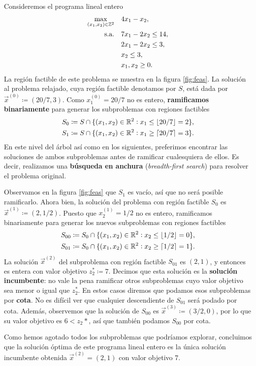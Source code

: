 \begin{example}
	\label{ex:ilp}
	Consideremos el programa lineal entero
	\begin{align*}
		\max_{(x_1, x_2) \in \mathbb{Z}^2} \quad
			& 4x_1 - x_2, \\
			\text{s.a.} \quad
			& 7x_1 - 2x_2 \leq 14, \\
			& 2x_1 - 2x_2 \leq 3, \\
			& x_2 \leq 3, \\
			& x_1, x_2 \geq 0.
	\end{align*}
	La región factible de este problema se muestra en la figura \ref{fig:feas}. La solución al
	problema relajado, cuya región factible denotamos por $S$, está dada por $\vec{x}^{(0)} \coloneq
	(20/7, 3)$. Como $x_1^{(0)} = 20/7$ no es entero, \textbf{ramificamos binariamente} para generar
	los subproblemas con regiones factibles
	\begin{align*}
		S_{0} &\coloneq S \cap \lbrace  (x_1, x_2) \in \mathbb{R}^2 \vcentcolon x_1 \leq \left\lfloor 20/7 \right\rfloor = 2 \rbrace, \\
		S_{1} &\coloneq S \cap \lbrace  (x_1, x_2) \in \mathbb{R}^2 \vcentcolon x_1 \geq \left\lceil 20/7 \right\rceil = 3 \rbrace.
	\end{align*}
	En este nivel del árbol así como en los siguientes, preferimos encontrar las soluciones de ambos
	subproblemas antes de ramificar cualesquiera de ellos. Es decir, realizamos una \textbf{búsqueda
	en anchura} (\textit{breadth-first search}) para resolver el problema original.

	Observamos en la figura \ref{fig:feas} que $S_{1}$ es vacío, así que no será posible
	ramificarlo. Ahora bien, la solución del problema con región factible $S_{0}$ es $\vec{x}^{(1)}
	\coloneq (2, 1/2)$. Puesto que $x_2^{(1)} = 1/2$ no es entero, ramificamos binariamente para
	generar los nuevos subproblemas con regiones factibles
	\begin{align*}
		S_{00} &\coloneq S_{0} \cap \lbrace  (x_1, x_2) \in \mathbb{R}^2 \vcentcolon x_2 \leq \left\lfloor 1/2 \right\rfloor = 0 \rbrace, \\
		S_{01} &\coloneq S_{0} \cap \lbrace  (x_1, x_2) \in \mathbb{R}^2 \vcentcolon x_2 \geq \left\lceil 1/2 \right\rceil = 1 \rbrace.
	\end{align*}
	La solución $\vec{x}^{(2)}$ del subproblema con región factible $S_{01}$ es $(2, 1)$, y entonces
	es entera con valor objetivo $z_2^* \coloneq 7$. Decimos que esta solución es la
	\textbf{solución incumbente}: no vale la pena ramificar otros subproblemas cuyo valor objetivo
	sea menor o igual que $z_2^*$. En estos casos diremos que podamos esos subproblemas por
	\textbf{cota}. No es difícil ver que cualquier descendiente de $S_{01}$ será podado por cota.
	Además, observemos que la solución de $S_{00}$ es $\vec{x}^{(3)} \coloneq (3/2, 0)$, por lo que
	su valor objetivo es $6 < z_2*$, así que también podamos $S_{00}$ por cota.

	Como hemos agotado todos los subproblemas que podríamos explorar, concluimos que la solución
	óptima de este programa lineal entero es la única solución incumbente obtenida $\vec{x}^{(2)} =
	(2, 1)$ con valor objetivo 7.
\end{example}

